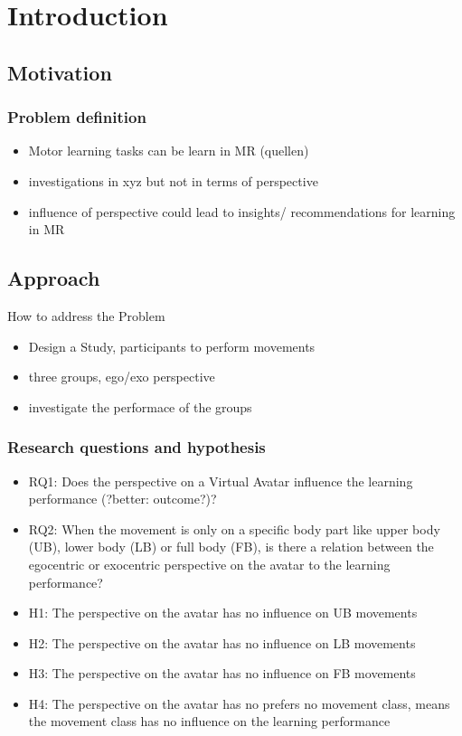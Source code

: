 \chapter{Introduction}
\section{Motivation}
\subsection{Problem definition}
\begin{itemize}
	\item Motor learning tasks can be learn in MR (quellen)
	\item investigations in xyz but not in terms of perspective
	\item influence of perspective could lead to insights/ recommendations for learning in MR
\end{itemize}
\section{Approach}
How to address the Problem
\begin{itemize}
	\item Design a Study, participants to perform movements
	\item three groups, ego/exo perspective
	\item investigate the performace of the groups
\end{itemize}
\subsection{Research questions and hypothesis}
\begin{itemize}
	\item RQ1: Does the perspective on a Virtual Avatar influence the learning performance (?better: outcome?)?
	\item RQ2: When the movement is only on a specific body part like upper body (UB), lower body (LB) or full body (FB), is there a relation between the egocentric or exocentric perspective on the avatar to the learning performance?
	\item H1: The perspective on the avatar has no influence on UB movements
	\item H2: The perspective on the avatar has no influence on LB movements
	\item H3: The perspective on the avatar has no influence on FB movements
	\item H4: The perspective on the avatar has no prefers no movement class, means the movement class has no influence on the learning performance 
\end{itemize}
	
